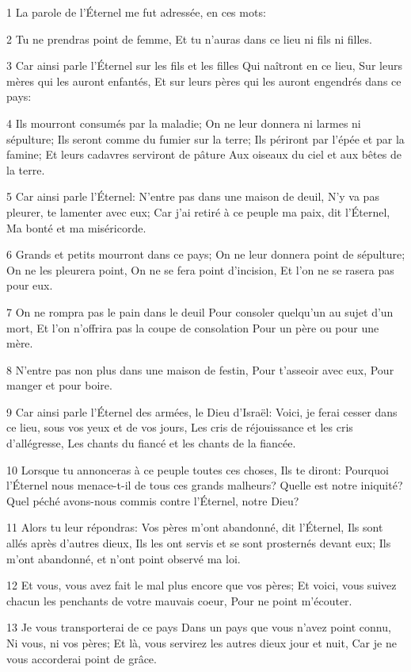 \par 1 La parole de l'Éternel me fut adressée, en ces mots:
\par 2 Tu ne prendras point de femme, Et tu n'auras dans ce lieu ni fils ni filles.
\par 3 Car ainsi parle l'Éternel sur les fils et les filles Qui naîtront en ce lieu, Sur leurs mères qui les auront enfantés, Et sur leurs pères qui les auront engendrés dans ce pays:
\par 4 Ils mourront consumés par la maladie; On ne leur donnera ni larmes ni sépulture; Ils seront comme du fumier sur la terre; Ils périront par l'épée et par la famine; Et leurs cadavres serviront de pâture Aux oiseaux du ciel et aux bêtes de la terre.
\par 5 Car ainsi parle l'Éternel: N'entre pas dans une maison de deuil, N'y va pas pleurer, te lamenter avec eux; Car j'ai retiré à ce peuple ma paix, dit l'Éternel, Ma bonté et ma miséricorde.
\par 6 Grands et petits mourront dans ce pays; On ne leur donnera point de sépulture; On ne les pleurera point, On ne se fera point d'incision, Et l'on ne se rasera pas pour eux.
\par 7 On ne rompra pas le pain dans le deuil Pour consoler quelqu'un au sujet d'un mort, Et l'on n'offrira pas la coupe de consolation Pour un père ou pour une mère.
\par 8 N'entre pas non plus dans une maison de festin, Pour t'asseoir avec eux, Pour manger et pour boire.
\par 9 Car ainsi parle l'Éternel des armées, le Dieu d'Israël: Voici, je ferai cesser dans ce lieu, sous vos yeux et de vos jours, Les cris de réjouissance et les cris d'allégresse, Les chants du fiancé et les chants de la fiancée.
\par 10 Lorsque tu annonceras à ce peuple toutes ces choses, Ils te diront: Pourquoi l'Éternel nous menace-t-il de tous ces grands malheurs? Quelle est notre iniquité? Quel péché avons-nous commis contre l'Éternel, notre Dieu?
\par 11 Alors tu leur répondras: Vos pères m'ont abandonné, dit l'Éternel, Ils sont allés après d'autres dieux, Ils les ont servis et se sont prosternés devant eux; Ils m'ont abandonné, et n'ont point observé ma loi.
\par 12 Et vous, vous avez fait le mal plus encore que vos pères; Et voici, vous suivez chacun les penchants de votre mauvais coeur, Pour ne point m'écouter.
\par 13 Je vous transporterai de ce pays Dans un pays que vous n'avez point connu, Ni vous, ni vos pères; Et là, vous servirez les autres dieux jour et nuit, Car je ne vous accorderai point de grâce.
